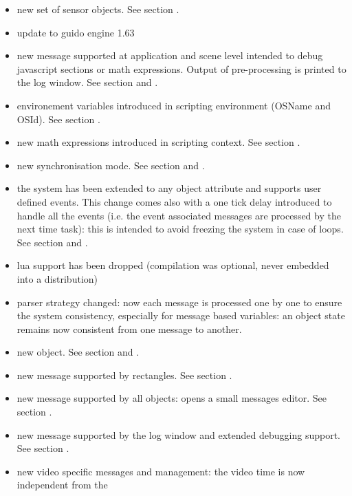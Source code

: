 
\begin{itemize}
\item new set of sensor objects. See section .
\item update to guido engine 1.63
\item new  message supported at application and scene level intended to debug javascript sections or math expressions. Output of pre-processing is printed to the log window. See section  and  .
\item environement variables introduced in scripting environment (OSName and OSId). See section .
\item new math expressions introduced in scripting context. See section .
\item new  synchronisation mode. See section  and .
\item the  system has been extended to any object attribute and supports user defined events.
  This change comes also with a one tick delay introduced to handle all the events (i.e. the 
  event associated messages are processed by the next time task): this is intended to avoid
  freezing the system in case of loops. See section  and  .
\item lua support has been dropped (compilation was optional, never embedded into a distribution)
\item parser strategy changed: now each message is processed one by one to ensure the system
  consistency, especially for message based variables: an object state remains now consistent 
  from one message to another.
\item new  object. See section  and  .
\item new  message supported by rectangles. See section .
\item new  message supported by all objects: opens a small messages editor. See section .
\item new  message supported by the log window and extended debugging support. See section .
\item new video specific messages and management: the video time is now independent from the 

\end{itemize}
